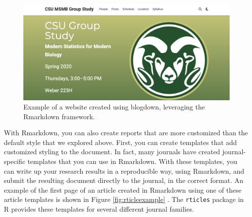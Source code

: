 \documentclass[]{tufte-book}
\begin{document}
\begin{figure}
\includegraphics[width=\textwidth]{figures/blogdownexample} \caption[Example of a website created using blogdown, leveraging the Rmarkdown framework]{Example of a website created using blogdown, leveraging the Rmarkdown framework.}\label{fig:blogdown}
\end{figure}

With Rmarkdown, you can also create reports that are more customized than the
default style that we explored above. First, you can create templates that add
customized styling to the document. In fact, many journals have created
journal-specific templates that you can use in Rmarkdown. With these templates,
you can write up your research results in a reproducible way, using Rmarkdown,
and submit the resulting document directly to the journal, in the correct
format. An example of the first page of an article created in Rmarkdown using
one of these article templates is shown in Figure \ref{fig:rticleexample}
\citep{wendt2022ten}. The \texttt{rticles} package in R provides these templates for several
different journal families.
\end{document}

